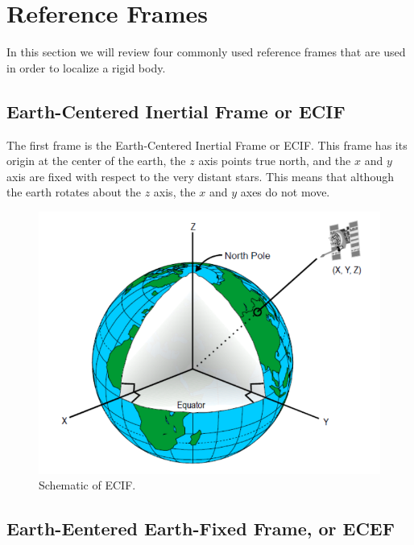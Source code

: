 \section{Reference Frames}
\label{reference_frames}


In this section we will review four commonly used reference frames that are
used in order to localize a rigid body. 

\subsection{Earth-Centered Inertial Frame or ECIF}

The first frame is the Earth-Centered
Inertial Frame or ECIF. This frame has its origin
at the center of the earth, the $z$ axis points true north, and the $x$ and $y$ axis are fixed with
respect to the very distant stars. This means that although the earth
rotates about the $z$ axis, the $x$ and $y$ axes do not move. 

\begin{figure}[!htb]
\begin{center}
\includegraphics[scale=0.290]{img/coordinate_transforms/ref_frame_1.jpeg}
\end{center}
\caption{Schematic of ECIF.}
\label{ref_frame_1}
\end{figure}

\subsection{Earth-Eentered Earth-Fixed Frame, or ECEF}

